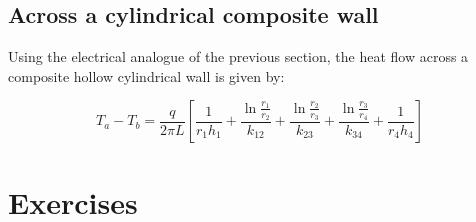 \subsection{Across a cylindrical composite wall}

Using the electrical analogue of the previous section, the heat flow across a
composite hollow cylindrical wall is given by:

$$ T_a - T_b = \frac{q}{2 \pi L} \left[ \frac{1}{r_1 h_1} +
\frac{\ln{\frac{r_1}{r_2}}}{k_{12}} + \frac{\ln{\frac{r_2}{r_3}}}{k_{23}} +
\frac{\ln{\frac{r_3}{r_4}}}{k_{34}} + \frac{1}{r_4 h_4} \right] $$

\pagebreak
\section{Exercises}

